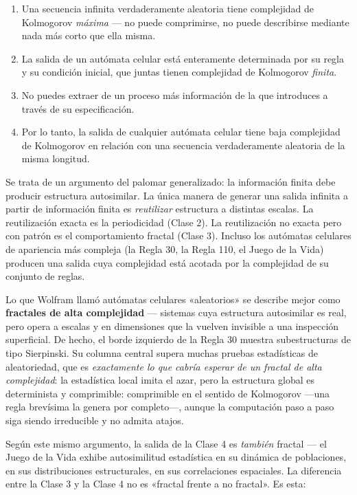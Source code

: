 \documentclass[11pt, twoside, openright]{book}
\begin{document}
\begin{enumerate}
  \item Una secuencia infinita verdaderamente aleatoria tiene complejidad de Kolmogorov \textit{máxima} --- no puede comprimirse, no puede describirse mediante nada más corto que ella misma.
  \item La salida de un autómata celular está enteramente determinada por su regla y su condición inicial, que juntas tienen complejidad de Kolmogorov \textit{finita}.
  \item No puedes extraer de un proceso más información de la que introduces a través de su especificación.
  \item Por lo tanto, la salida de cualquier autómata celular tiene baja complejidad de Kolmogorov en relación con una secuencia verdaderamente aleatoria de la misma longitud.
\end{enumerate}

Se trata de un argumento del palomar generalizado: la información finita debe producir estructura autosimilar. La única manera de generar una salida infinita a partir de información finita es \textit{reutilizar} estructura a distintas escalas. La reutilización exacta es la periodicidad (Clase 2). La reutilización no exacta pero con patrón es el comportamiento fractal (Clase 3). Incluso los autómatas celulares de apariencia más compleja (la Regla 30, la Regla 110, el Juego de la Vida) producen una salida cuya complejidad está acotada por la complejidad de su conjunto de reglas.

Lo que Wolfram llamó autómatas celulares «aleatorios» se describe mejor como \textbf{fractales de alta complejidad} --- sistemas cuya estructura autosimilar es real, pero opera a escalas y en dimensiones que la vuelven invisible a una inspección superficial. De hecho, el borde izquierdo de la Regla 30 muestra subestructuras de tipo Sierpinski. Su columna central supera muchas pruebas estadísticas de aleatoriedad, que es \textit{exactamente lo que cabría esperar de un fractal de alta complejidad}: la estadística local imita el azar, pero la estructura global es determinista y comprimible: comprimible en el sentido de Kolmogorov ---una regla brevísima la genera por completo---, aunque la computación paso a paso siga siendo irreducible y no admita atajos.

Según este mismo argumento, la salida de la Clase 4 es \textit{también} fractal --- el Juego de la Vida exhibe autosimilitud estadística en su dinámica de poblaciones, en sus distribuciones estructurales, en sus correlaciones espaciales. La diferencia entre la Clase 3 y la Clase 4 no es «fractal frente a no fractal». Es esta:
\end{document}
